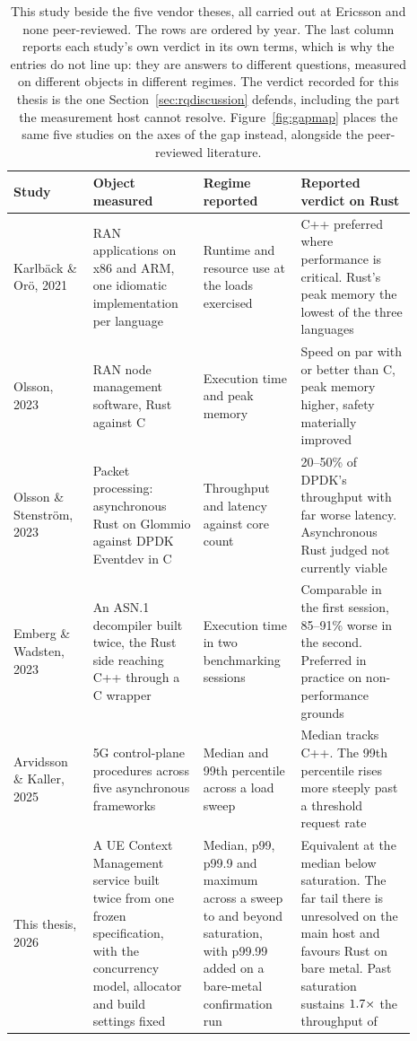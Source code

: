 \documentclass[english,oneside,a4paper,censored,csm,software-track-2020]{HYthesisML}
\renewcommand{\arraystretch}{0.95}
\begin{document}
\begin{table}[tp]
\centering
\small
\caption[This study beside the five vendor theses]{This study beside the five vendor theses, all
carried out at Ericsson and none peer-reviewed. The rows are ordered by year. The last column
reports each study's own verdict in its own terms, which is why the entries do not line up: they
are answers to different questions, measured on different objects in different regimes. The
verdict recorded for this thesis is the one Section~\ref{sec:rqdiscussion} defends, including the
part the measurement host cannot resolve. Figure~\ref{fig:gapmap} places the same five studies on
the axes of the gap instead, alongside the peer-reviewed
literature.\label{tab:vendortheses}}
\renewcommand{\arraystretch}{1.2}
\begin{tabular}{@{}R{0.18\linewidth} R{0.25\linewidth} R{0.20\linewidth} R{0.26\linewidth}@{}}
\hline\hline
Study & Object measured & Regime reported & Reported verdict on Rust \\
\hline
Karlb\"ack \& Or\"o, 2021~\cite{karlback2021ran} &
RAN applications on x86 and ARM, one idiomatic implementation per language &
Runtime and resource use at the loads exercised &
C++ preferred where performance is critical. Rust's peak memory the lowest of the three
languages \\
Olsson, 2023~\cite{olsson2023ranmgmt} &
RAN node management software, Rust against C &
Execution time and peak memory &
Speed on par with or better than C, peak memory higher, safety materially improved \\
Olsson \& Stenstr\"om, 2023~\cite{olsson2023asyncpackets} &
Packet processing: asynchronous Rust on Glommio against DPDK Eventdev in C &
Throughput and latency against core count &
20--50\% of DPDK's throughput with far worse latency. Asynchronous Rust judged not currently
viable \\
Emberg \& Wadsten, 2023~\cite{emberg2023asn1} &
An {ASN.1} decompiler built twice, the Rust side reaching C++ through a C wrapper &
Execution time in two benchmarking sessions &
Comparable in the first session, 85--91\% worse in the second. Preferred in practice on
non-performance grounds \\
Arvidsson \& Kaller, 2025~\cite{arvidsson2025async} &
5G control-plane procedures across five asynchronous frameworks &
Median and 99th percentile across a load sweep &
Median tracks C++. The 99th percentile rises more steeply past a threshold request rate \\
\hline
This thesis, 2026 &
A UE Context Management service built twice from one frozen specification, with the concurrency
model, allocator and build settings fixed &
Median, p99, p99.9 and maximum across a sweep to and beyond saturation, with p99.99 added on a
bare-metal confirmation run &
Equivalent at the median below saturation. The far tail there is unresolved on the main host and
favours Rust on bare metal. Past saturation \OverloadSustainedFaster{} sustains
$1.7\times$ the throughput of \OverloadSustainedSlower{} \\
\hline
\end{tabular}
\end{table}
\end{document}
